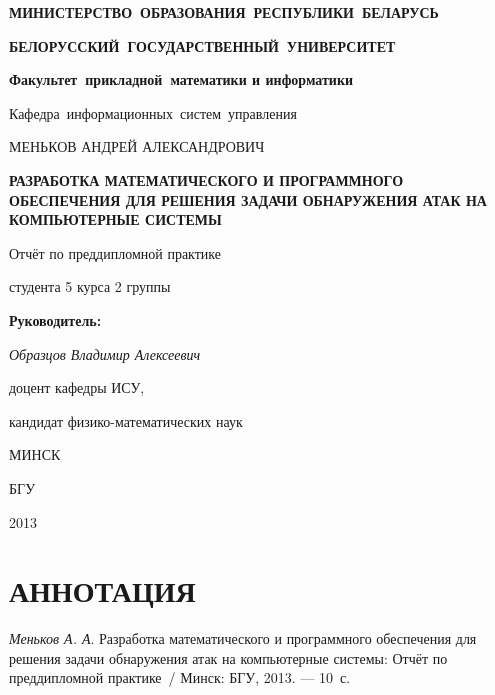 \titlepage
\begin{center}
	\begin{large}
		\textbf{МИНИСТЕРСТВО~ОБРАЗОВАНИЯ~РЕСПУБЛИКИ~БЕЛАРУСЬ}
		
		\smallskip
		\textbf{БЕЛОРУССКИЙ~ГОСУДАРСТВЕННЫЙ~УНИВЕРСИТЕТ}
		
		\smallskip
		\textbf{Факультет~прикладной~математики и информатики}
		
		\smallskip
		Кафедра~информационных~систем~управления
	\end{large}
\end{center}

\vfill

\begin{center}
	\large {МЕНЬКОВ АНДРЕЙ АЛЕКСАНДРОВИЧ}
	
	\bigskip	
	{\Large \textbf{РАЗРАБОТКА МАТЕМАТИЧЕСКОГО И ПРОГРАММНОГО ОБЕСПЕЧЕНИЯ ДЛЯ РЕШЕНИЯ ЗАДАЧИ ОБНАРУЖЕНИЯ АТАК НА КОМПЬЮТЕРНЫЕ СИСТЕМЫ}}
	
	\bigskip
	Отчёт по преддипломной практике
	
	студента 5 курса 2 группы
\end{center}


\vfill
\begin{flushright}
	\begin{minipage}{7cm}
		\textbf{Руководитель:}
		
		\textit{Образцов Владимир Алексеевич}
		
		доцент кафедры ИСУ,
		
		кандидат физико-математических наук 
	\end{minipage}
\end{flushright}

\vfill

\begin{center}
	МИНСК
	
	БГУ
	
	2013
\end{center}

\newpage

\newcommand{\pagescount}{10}
\section*{АННОТАЦИЯ}

\textit{Меньков А. А}. Разработка математического и программного обеспечения для решения задачи обнаружения атак на компьютерные системы:
Отчёт по преддипломной практике~/ Минск: 
БГУ, 2013. --- \pagescount~с.

